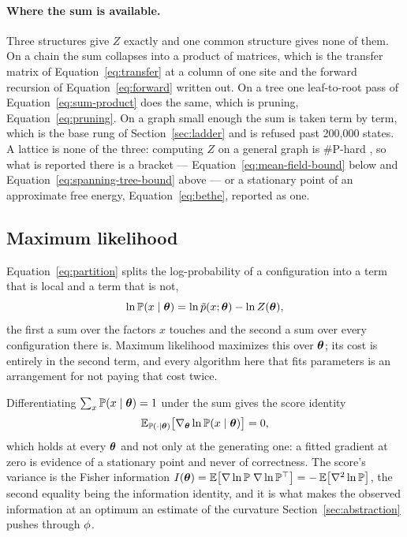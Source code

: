 \documentclass[11pt,a4paper]{article}
\begin{document}
\paragraph{Where the sum is available.}
Three structures give $Z$ exactly and one common structure gives none of them.
On a chain the sum collapses into a product of matrices, which is the transfer
matrix of Equation~\ref{eq:transfer} at a column of one site and the forward
recursion of Equation~\ref{eq:forward} written out. On a tree one leaf-to-root
pass of Equation~\ref{eq:sum-product} does the same, which is pruning,
Equation~\ref{eq:pruning}. On a graph small enough the sum is taken term by
term, which is the base rung of Section~\ref{sec:ladder} and is refused past
200,000 states. A lattice is none of the three: computing $Z$ on a general
graph is \#P-hard \citep{koller2009}, so what is reported there is a bracket
--- Equation~\ref{eq:mean-field-bound} below and
Equation~\ref{eq:spanning-tree-bound} above --- or a stationary point of an
approximate free energy, Equation~\ref{eq:bethe}, reported as one.

\subsection{Maximum likelihood}

Equation~\ref{eq:partition} splits the log-probability of a configuration into
a term that is local and a term that is not,
\[
  \ln \mathbb{P}(x \mid \boldsymbol{\theta})
    = \ln \tilde{p}(x; \boldsymbol{\theta}) - \ln Z(\boldsymbol{\theta}),
\]
the first a sum over the factors $x$ touches and the second a sum over every
configuration there is. Maximum likelihood maximizes this over $\boldsymbol{\theta}$; its
cost is entirely in the second term, and every algorithm here that fits
parameters is an arrangement for not paying that cost twice.

Differentiating $\sum_x \mathbb{P}(x \mid \boldsymbol{\theta}) = 1$ under the sum gives the
score identity
\begin{equation}
  \mathbb{E}_{\mathbb{P}(\cdot \mid \boldsymbol{\theta})}
    \big[ \nabla_{\boldsymbol{\theta}} \ln \mathbb{P}(x \mid \boldsymbol{\theta}) \big] = 0,
  \label{eq:score}
\end{equation}
which holds at every $\boldsymbol{\theta}$ and not only at the generating one: a fitted
gradient at zero is evidence of a stationary point and never of correctness.
The score's variance is the Fisher information
$I(\boldsymbol{\theta})
 = \mathbb{E}\big[\nabla \ln \mathbb{P} \; \nabla \ln \mathbb{P}^{\top}\big]
 = -\,\mathbb{E}\big[\nabla^2 \ln \mathbb{P}\big]$,
the second equality being the information identity, and it is what makes the
observed information at an optimum an estimate of the curvature
Section~\ref{sec:abstraction} pushes through $\phi$.
\end{document}
